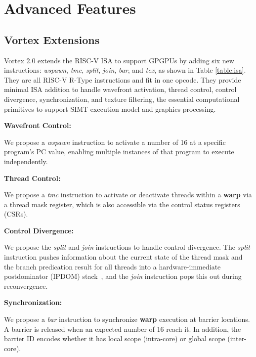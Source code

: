 \documentclass{book}
\newcommand{\warps}{16 } %
\newcommand{\warp}{\textbf{warp}}
\begin{document}
\chapter{Advanced Features}
\section{Vortex Extensions}
Vortex 2.0  extends the RISC-V ISA to support GPGPUs by adding six new instructions: \emph{wspawn}, \emph{tmc}, \emph{split}, \emph{join}, \emph{bar}, and \emph{tex}, as shown in Table \ref{table:isa}. They are all RISC-V R-Type instructions and fit in one opcode. They provide minimal ISA addition to handle wavefront activation, thread control, control divergence, synchronization, and texture filtering, the essential computational primitives to support SIMT execution model and graphics processing.

\textbf{Wavefront Control:} \label{wc}

We propose a \textit{wspawn} instruction to activate a number of {\warps} at a specific program's PC value, enabling multiple instances of that program to execute independently.

\textbf{Thread Control:}

We propose a \textit{tmc} instruction
  to activate or deactivate threads within a {\warp} via a thread mask register, which is also accessible via the control status registers (CSRs).

\textbf{Control Divergence:}

  We propose the \textit{split} and \textit{join} instructions to handle control divergence. The \textit{split} instruction pushes information about the current state of the thread mask and the branch predication result for all threads into a hardware-immediate postdominator (IPDOM) stack~\cite{Kersey:2017:LSC:3132402.3132426}, and the \textit{join} instruction pops this out during reconvergence.

\textbf{Synchronization:}

  We propose a \textit{bar} instruction to synchronize {\warp} execution at barrier locations. A barrier is released when an expected number of {\warps} reach it. In addition, the barrier ID encodes whether it has local scope (intra-core) or global scope (inter-core).
\end{document}
